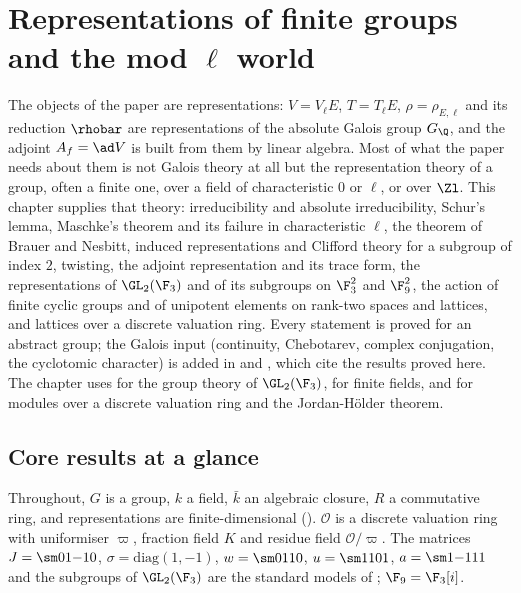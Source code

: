 \chapter{Representations of finite groups and the mod \texorpdfstring{$\ell$}{l} world}\label{ch:reps}

The objects of the paper are representations: $V=V_\ell E$, $T=T_\ell E$, $\rho=\rho_{E,\ell}$ and its reduction $\rhobar$ are
representations of the absolute Galois group $G_\Q$, and the adjoint $A_f=\ad V$ is built from them by linear algebra. Most of
what the paper needs about them is not Galois theory at all but the representation theory of a group, often a finite one, over a
field of characteristic $0$ or $\ell$, or over $\Zl$. This chapter supplies that theory: irreducibility and absolute
irreducibility, Schur's lemma, Maschke's theorem and its failure in characteristic $\ell$, the theorem of Brauer and Nesbitt,
induced representations and Clifford theory for a subgroup of index $2$, twisting, the adjoint representation and its trace form,
the representations of $\GL_2(\F_3)$ and of its subgroups on $\F_3^2$ and $\F_9^2$, the action of finite cyclic groups and of
unipotent elements on rank-two spaces and lattices, and lattices over a discrete valuation ring. Every statement is proved for an
abstract group; the Galois input (continuity, Chebotarev, complex conjugation, the cyclotomic character) is added in
 and , which cite the results proved here. The chapter uses  for the group theory
of $\GL_2(\F_3)$,  for finite fields, and  for modules over a discrete valuation ring and the
Jordan-H\"older theorem.

\section*{Core results at a glance}

Throughout, $G$ is a group, $k$ a field, $\bar k$ an algebraic closure, $R$ a commutative ring, and representations are
finite-dimensional (). $\mathcal{O}$ is a discrete valuation ring with uniformiser $\varpi$, fraction field
$K$ and residue field $\mathcal{O}/\varpi$. The matrices $J=\sm01{-1}0$, $\sigma=\mathrm{diag}(1,-1)$, $w=\sm0110$, $u=\sm1101$,
$a=\sm1{-1}11$ and the subgroups of $\GL_2(\F_3)$ are the standard models of ; $\F_9=\F_3[i]$.

